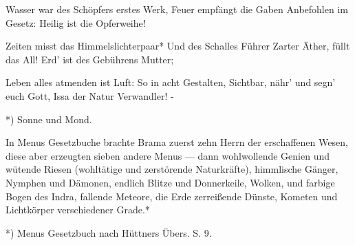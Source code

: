 \documentclass[a4paper, 11pt, oneside, polutonikogreek, german]{article}
\begin{document}
Wasser war des Schöpfers erstes Werk,
Feuer empfängt die Gaben
Anbefohlen im Gesetz:
Heilig ist die Opferweihe!

Zeiten misst das Himmelslichterpaar*
Und des Schalles Führer
Zarter Äther, füllt das All!
Erd' ist des Gebührens Mutter;

Leben alles atmenden ist Luft:
So in acht Gestalten,
Sichtbar, nähr' und segn' euch Gott,
Issa der Natur Verwandler! -

*) Sonne und Mond.

In Menus Gesetzbuche brachte Brama zuerst zehn Herrn der erschaffenen Wesen, diese aber erzeugten sieben andere Menus --- dann wohlwollende Genien und wütende Riesen (wohltätige und zerstörende Naturkräfte), himmlische Gänger, Nymphen und Dämonen, endlich Blitze und Donnerkeile, Wolken, und farbige Bogen des Indra, fallende Meteore, die Erde zerreißende Dünste, Kometen und Lichtkörper verschiedener Grade.*

*) Menus Gesetzbuch nach Hüttners Übers. S. 9.
\end{document}
